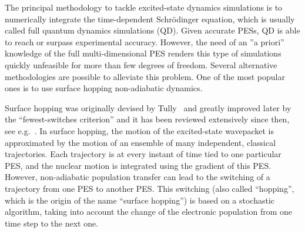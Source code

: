 \documentclass[a4paper,11pt,DIV=15,openany,twoside=false]{scrbook}
\begin{document}
The principal methodology to tackle excited-state dynamics simulations is to numerically integrate the time-dependent Schr\"odinger equation, which is usually called full quantum dynamics simulations (QD). Given accurate PESs, QD is able to reach or surpass experimental accuracy. However, the need of an ''a priori'' knowledge of the full multi-dimensional PES renders this type of simulations quickly unfeasible for more than few degrees of freedom. Several alternative methodologies are possible to alleviate this problem. One of the most popular ones is to use surface hopping non-adiabatic dynamics.

Surface hopping was originally devised by Tully~\cite{Tully1971JCP} and greatly improved later by the ``fewest-switches criterion''\cite{Tully1990JCP} and it has been reviewed extensively since then, see e.g.~\cite{Barbatti2011WCMS,Doltsinis2006,Doltsinis2002JTCC}.
In surface hopping, the motion of the excited-state wavepacket is approximated by the motion of an ensemble of many independent, classical trajectories. Each trajectory is at every instant of time tied to one particular PES, and the nuclear motion is integrated using the gradient of this PES. However, non-adiabatic population transfer can lead to the switching of a trajectory from one PES to another PES. This switching (also called ``hopping'', which is the origin of the name ``surface hopping'') is based on a stochastic algorithm, taking into account the change of the electronic population from one time step to the next one.
\end{document}

